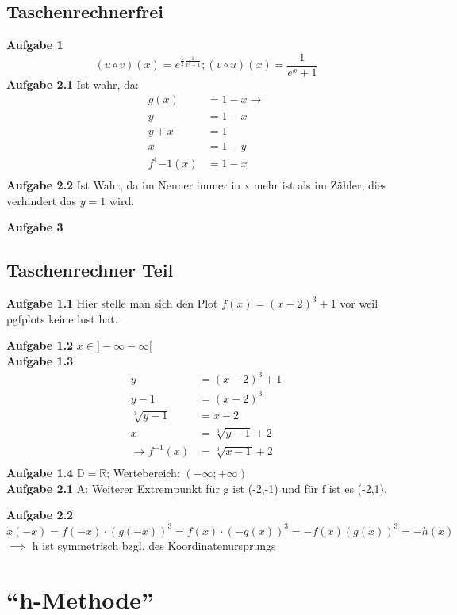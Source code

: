 \documentclass{report}
\begin{document}
\subsection*{Taschenrechnerfrei}
\textbf{Aufgabe 1}
\[(u\circ v)(x)=e^{\frac{1}{2}\frac{1}{x^2+1}} ; (v\circ u)(x)=\frac{1}{e^x+1} \]
\textbf{Aufgabe 2.1}
Ist wahr, da:
\begin{align*}
    g(x) & =1-x  \to\\
        y &= 1-x\\
        y+x & = 1\\
        x & = 1-y\\
        f^1{-1}(x) & =1-x\\
\end{align*}
\textbf{Aufgabe 2.2}
Ist Wahr, da im Nenner immer in x mehr ist als im Zähler, dies verhindert das $y=1$ wird.

\noindent\textbf{Aufgabe 3}
\subsection*{Taschenrechner Teil}
\textbf{Aufgabe 1.1}
Hier stelle man sich den Plot $f(x)=(x-2)^3+1$ vor weil pgfplots keine lust hat.

\noindent \textbf{Aufgabe 1.2} $x \in ]-\infty-\infty[$\\
\noindent \textbf{Aufgabe 1.3}
\begin{align*}
   y&= (x-2)^3+1 \\ 
   y-1&= (x-2)^3 \\
   \sqrt[3]{y-1}&= x-2 \\ 
   x&=\sqrt[3]{y-1}+2 \\
   \to f^{-1}(x)&= \sqrt[3]{x-1}+2\\
\end{align*}
\textbf{Aufgabe 1.4} $\mathbb{D}=\mathbb{R}$; Wertebereich: $(-\infty;+\infty)$\\
\textbf{Aufgabe 2.1} 
A: Weiterer Extrempunkt für g ist (-2,-1) und für f ist es (-2,1).

\noindent\textbf{Aufgabe 2.2}
\[x(-x)=f(-x)\cdot (g(-x))^3=f(x)\cdot (-g(x))^3=-f(x)(g(x))^3=-h(x)\]
$\implies$ h ist symmetrisch bzgl. des Koordinatenursprungs
\clearpage%

\section{``h-Methode''}
\end{document}
